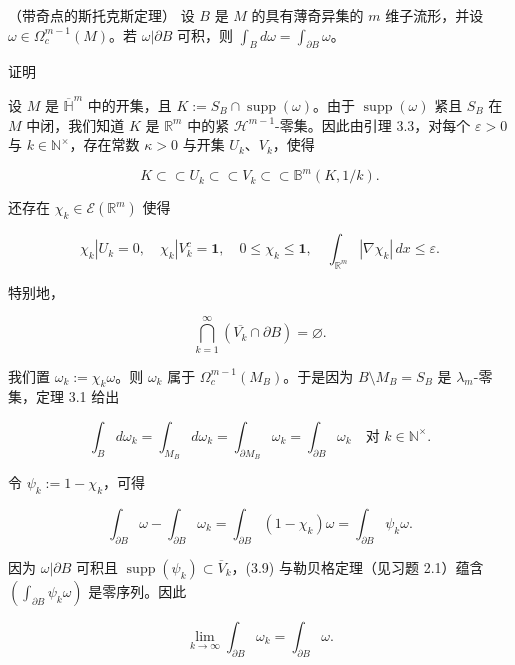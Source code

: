 \begin{theorem}

（带奇点的斯托克斯定理） 设 $ B $ 是 $ M $ 的具有薄奇异集的 $ m $ 维子流形，并设 $ \omega \in \Omega_c^{m-1}(M) $。若 $ \omega|\partial B $ 可积，则 $ \int_B d\omega = \int_{\partial B}\omega $。

证明

\begin{subitems}
\item

设 $ M $ 是 $ \overline{\mathbb{H}}^m $ 中的开集，且 $ K := S_B \cap \operatorname{supp}(\omega) $。由于 $ \operatorname{supp}(\omega) $ 紧且 $ S_B $ 在 $ M $ 中闭，我们知道 $ K $ 是 $ \mathbb{R}^m $ 中的紧 $ \mathcal{H}^{m-1} $-零集。因此由引理 3.3，对每个 $ \varepsilon > 0 $ 与 $ k \in \mathbb{N}^\times $，存在常数 $ \kappa > 0 $ 与开集 $ U_k $、$ V_k $，使得

\[
K \subset\subset U_k \subset\subset V_k \subset\subset \mathbb{B}^m(K,1/k) .
\]

还存在 $ \chi_k \in \mathcal{E}(\mathbb{R}^m) $ 使得

\[
\chi_k|U_k = 0 , \quad \chi_k|V_k^c = \mathbf{1} , \quad 0 \le \chi_k \le \mathbf{1} , \quad \int_{\mathbb{R}^m}|\nabla\chi_k|\,dx \le \varepsilon .
\]

特别地，

\begin{equation}
\bigcap_{k=1}^{\infty}(\overline{V_k}\cap\partial B) = \varnothing .\tag{3.9}
\end{equation}

我们置 $ \omega_k := \chi_k\omega $。则 $ \omega_k $ 属于 $ \Omega_c^{m-1}(M_B) $。于是因为 $ B\setminus M_B = S_B $ 是 $ \lambda_m $-零集，定理 3.1 给出

\begin{equation}
\int_B d\omega_k = \int_{M_B}d\omega_k = \int_{\partial M_B}\omega_k = \int_{\partial B}\omega_k \quad \text{对 } k \in \mathbb{N}^\times .\tag{3.10}
\end{equation}

令 $ \psi_k := 1-\chi_k $，可得

\[
\int_{\partial B}\omega - \int_{\partial B}\omega_k = \int_{\partial B}(1-\chi_k)\omega = \int_{\partial B}\psi_k\omega .
\]

因为 $ \omega|\partial B $ 可积且 $ \operatorname{supp}(\psi_k) \subset \overline{V}_k $，(3.9) 与勒贝格定理（见习题 2.1）蕴含 $ (\int_{\partial B}\psi_k\omega) $ 是零序列。因此

\begin{equation}
\lim_{k\to\infty}\int_{\partial B}\omega_k = \int_{\partial B}\omega .\tag{3.11}
\end{equation}


\end{subitems}
\end{theorem}

